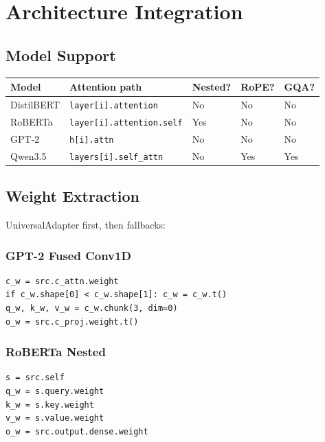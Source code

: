 \section{Architecture Integration}

\subsection{Model Support}

\begin{table}[H]
\centering
\small
\begin{tabular}{lllll}
\toprule
\textbf{Model} & \textbf{Attention path} & \textbf{Nested?} & \textbf{RoPE?} & \textbf{GQA?} \\
\midrule
DistilBERT & \texttt{layer[i].attention} & No & No & No \\
RoBERTa & \texttt{layer[i].attention.self} & Yes & No & No \\
GPT-2 & \texttt{h[i].attn} & No & No & No \\
Qwen3.5 & \texttt{layers[i].self\_attn} & No & Yes & Yes \\
\bottomrule
\end{tabular}
\end{table}

\subsection{Weight Extraction}

UniversalAdapter first, then fallbacks:

\subsubsection{GPT-2 Fused Conv1D}

\begin{lstlisting}
c_w = src.c_attn.weight
if c_w.shape[0] < c_w.shape[1]: c_w = c_w.t()
q_w, k_w, v_w = c_w.chunk(3, dim=0)
o_w = src.c_proj.weight.t()
\end{lstlisting}

\subsubsection{RoBERTa Nested}

\begin{lstlisting}
s = src.self
q_w = s.query.weight
k_w = s.key.weight
v_w = s.value.weight
o_w = src.output.dense.weight
\end{lstlisting}

